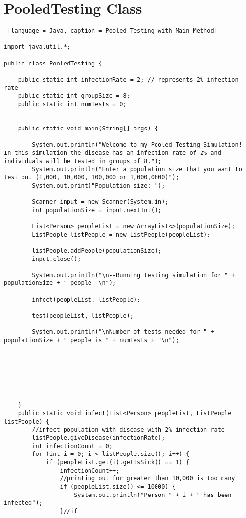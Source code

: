 \documentclass{article}
\begin{document}
\section{PooledTesting Class}

\begin{lstlisting} [language = Java, caption = Pooled Testing with Main Method]

import java.util.*;

public class PooledTesting {
    
    public static int infectionRate = 2; // represents 2% infection rate
    public static int groupSize = 8;
    public static int numTests = 0;
    

    public static void main(String[] args) {

        System.out.println("Welcome to my Pooled Testing Simulation! In this simulation the disease has an infection rate of 2% and individuals will be tested in groups of 8.");
        System.out.println("Enter a population size that you want to test on. (1,000, 10,000, 100,000 or 1,000,0000)");
        System.out.print("Population size: ");

        Scanner input = new Scanner(System.in);
        int populationSize = input.nextInt();

        List<Person> peopleList = new ArrayList<>(populationSize);
        ListPeople listPeople = new ListPeople(peopleList);

        listPeople.addPeople(populationSize);
        input.close();

        System.out.println("\n--Running testing simulation for " + populationSize + " people--\n");

        infect(peopleList, listPeople);

        test(peopleList, listPeople);

        System.out.println("\nNumber of tests needed for " + populationSize + " people is " + numTests + "\n");

   
        


    

    }
    public static void infect(List<Person> peopleList, ListPeople listPeople) {
        //infect population with disease with 2% infection rate
        listPeople.giveDisease(infectionRate);
        int infectionCount = 0;
        for (int i = 0; i < listPeople.size(); i++) {
            if (peopleList.get(i).getIsSick() == 1) {
                infectionCount++;
                //printing out for greater than 10,000 is too many 
                if (peopleList.size() <= 10000) {
                    System.out.println("Person " + i + " has been infected");
                }//if


\end{lstlisting}
\end{document}
